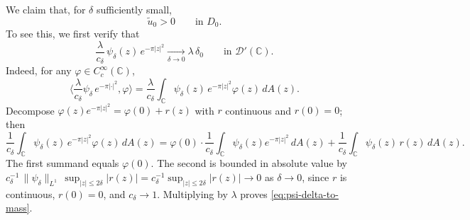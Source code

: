 \documentclass[a4paper,11pt,reqno]{amsart}
\numberwithin{equation}{section}
\theoremstyle{plain} %
\theoremstyle{definition} %
\theoremstyle{remark}
\newcommand{\C}{\mathbb{C}}
\begin{document}
We claim that, for $\delta$ sufficiently small,
\[
\widetilde u_0>0 \qquad \text{in } D_0.
\]
To see this, we first verify that
\begin{equation}\label{eq:psi-delta-to-mass}
\frac{\lambda}{c_\delta}\,\psi_\delta(z)\,e^{-\pi|z|^2}\xrightarrow[\delta\to 0]{}\lambda\,\delta_0
\qquad \text{in }\mathcal D'(\C).
\end{equation}
Indeed, for any $\varphi\in C_c^\infty(\C)$,
\[
\Big\langle \frac{\lambda}{c_\delta}\psi_\delta\, e^{-\pi|\cdot|^2},\varphi\Big\rangle
=
\frac{\lambda}{c_\delta}\int_\C \psi_\delta(z)\,e^{-\pi|z|^2}\varphi(z)\,dA(z).
\]
Decompose $\varphi(z)e^{-\pi|z|^2}=\varphi(0)+r(z)$ with $r$ continuous and $r(0)=0$; then
\[
\frac{1}{c_\delta}\int_\C \psi_\delta(z)\,e^{-\pi|z|^2}\varphi(z)\,dA(z)
=
\varphi(0)\cdot\frac{1}{c_\delta}\int_\C\psi_\delta(z)e^{-\pi|z|^2}\,dA(z)
+
\frac{1}{c_\delta}\int_\C\psi_\delta(z)\,r(z)\,dA(z).
\]
The first summand equals $\varphi(0)$. The second is bounded in absolute value by $c_\delta^{-1}\,\|\psi_\delta\|_{L^1}\,\sup_{|z|\le 2\delta}|r(z)|=c_\delta^{-1}\sup_{|z|\le 2\delta}|r(z)|\to 0$ as $\delta\to 0$, since $r$ is continuous, $r(0)=0$, and $c_\delta\to 1$. Multiplying by $\lambda$ proves \eqref{eq:psi-delta-to-mass}.
\end{document}

